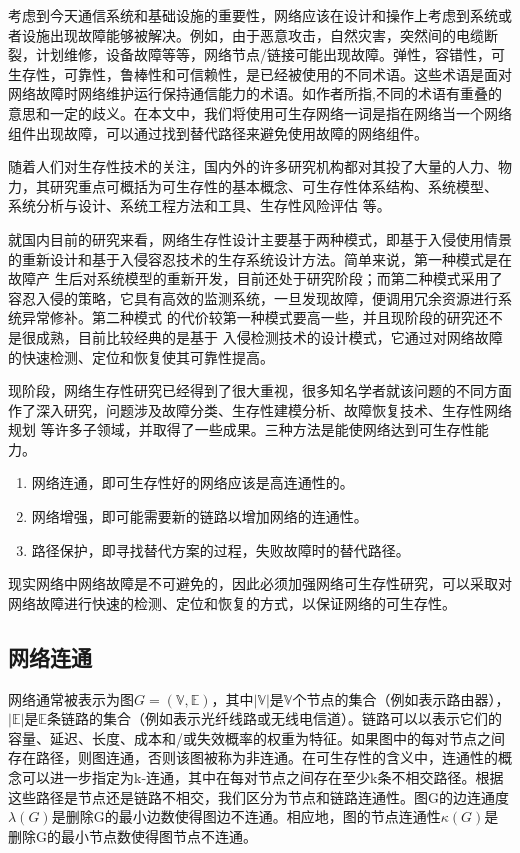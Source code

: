 考虑到今天通信系统和基础设施的重要性，网络应该在设计和操作上考虑到系统或者设施出现故障能够被解决。例如，由于恶意攻击，自然灾害，突然间的电缆断裂，计划维修，设备故障等等，网络节点/链接可能出现故障。弹性，容错性，可生存性，可靠性，鲁棒性和可信赖性，是已经被使用的不同术语。这些术语是面对网络故障时网络维护运行保持通信能力的术语。如作者\cite{al2009comparative}所指,不同的术语有重叠的意思和一定的歧义。在本文中，我们将使用可生存网络一词是指在网络当一个网络组件出现故障，可以通过找到替代路径来避免使用故障的网络组件。

随着人们对生存性技术的关注，国内外的许多研究机构都对其投了大量的人力、物 力，其研究重点可概括为可生存性的基本概念\cite{kuipers2012overview}、可生存性体系结构、系统模型\cite{luxinhua2006}、 系统分析与设计、系统工程方法和工具、生存性风险评估\cite{linxuegang2006} 等。


就国内目前的研究来看，网络生存性设计主要基于两种模式\cite{hanjianjun2007}，即基于入侵使用情景 的重新设计和基于入侵容忍技术的生存系统设计方法。简单来说，第一种模式是在故障产 生后对系统模型的重新开发，目前还处于研究阶段；而第二种模式采用了容忍入侵的策略，它具有高效的监测系统，一旦发现故障，便调用冗余资源进行系统异常修补。第二种模式 的代价较第一种模式要高一些，并且现阶段的研究还不是很成熟，目前比较经典的是基于 入侵检测技术的设计模式，它通过对网络故障的快速检测、定位和恢复使其可靠性提高。

现阶段，网络生存性研究已经得到了很大重视，很多知名学者就该问题的不同方面作了深入研究，问题涉及故障分类、生存性建模分析、故障恢复技术、生存性网络规划 等许多子领域，并取得了一些成果。三种方法是能使网络达到可生存性能力。
\begin{enumerate}
\item 网络连通，即可生存性好的网络应该是高连通性的。
\item 网络增强，即可能需要新的链路以增加网络的连通性。
\item 路径保护，即寻找替代方案的过程，失败故障时的替代路径。
\end{enumerate}


现实网络中网络故障是不可避免的，因此必须加强网络可生存性研究，可以采取对网络故障进行快速的检测、定位和恢复的方式，以保证网络的可生存性。
\subsection{网络连通}
网络通常被表示为图$G=(\mathbb{\mathbb{V}},\mathbb{\mathbb{E}})$，其中$|\mathbb{\mathbb{V}}|$是$\mathbb{\mathbb{V}}$个节点的集合（例如表示路由器），$|\mathbb{\mathbb{E}}|$是$\mathbb{\mathbb{E}}$条链路的集合（例如表示光纤线路或无线电信道）。链路可以以表示它们的容量、延迟、长度、成本和/或失效概率的权重为特征。如果图中的每对节点之间存在路径，则图连通，否则该图被称为非连通。在可生存性的含义中，连通性的概念可以进一步指定为k-连通，其中在每对节点之间存在至少k条不相交路径。根据这些路径是节点还是链路不相交，我们区分为节点和链路连通性。图G的边连通度$\lambda(G)$是删除G的最小边数使得图边不连通。相应地，图的节点连通性$\kappa(G)$是删除G的最小节点数使得图节点不连通。

